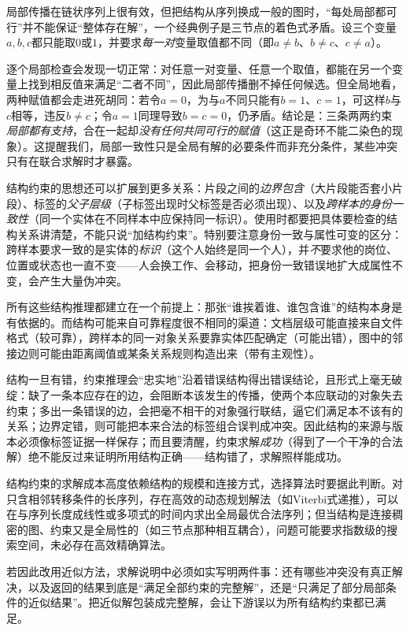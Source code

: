 局部传播在链状序列上很有效，但把结构从序列换成一般的图时，“每处局部都可行”并不能保证“整体存在解”，一个经典例子是三节点的着色式矛盾。设三个变量$a,b,c$都只能取$0$或$1$，并要求\emph{每一对}变量取值都不同（即$a\ne b$、$b\ne c$、$c\ne a$）。

逐个局部检查会发现一切正常：对任意一对变量、任意一个取值，都能在另一个变量上找到相反值来满足“二者不同”，因此局部传播删不掉任何候选。但全局地看，两种赋值都会走进死胡同：若令$a=0$，为与$a$不同只能有$b=1$、$c=1$，可这样$b$与$c$相等，违反$b\ne c$；令$a=1$同理导致$b=c=0$，仍矛盾。结论是：三条两两约束\emph{局部都有支持}，合在一起却\emph{没有任何共同可行的赋值}（这正是奇环不能二染色的现象）。这提醒我们，局部一致性只是全局有解的必要条件而非充分条件，某些冲突只有在联合求解时才暴露。

结构约束的思想还可以扩展到更多关系：片段之间的\emph{边界包含}（大片段能否套小片段）、标签的\emph{父子层级}（子标签出现时父标签是否必须出现）、以及\emph{跨样本的身份一致性}（同一个实体在不同样本中应保持同一标识）。使用时都要把具体要检查的结构关系讲清楚，不能只说“加结构约束”。特别要注意身份一致与属性可变的区分：跨样本要求一致的是实体的\emph{标识}（这个人始终是同一个人），并\emph{不}要求他的岗位、位置或状态也一直不变——人会换工作、会移动，把身份一致错误地扩大成属性不变，会产生大量伪冲突。

所有这些结构推理都建立在一个前提上：那张“谁挨着谁、谁包含谁”的结构本身是有依据的。而结构可能来自可靠程度很不相同的渠道：文档层级可能直接来自文件格式（较可靠），跨样本的同一对象关系要靠实体匹配确定（可能出错），图中的邻接边则可能由距离阈值或某条关系规则构造出来（带有主观性）。

结构一旦有错，约束推理会“忠实地”沿着错误结构得出错误结论，且形式上毫无破绽：缺了一条本应存在的边，会阻断本该发生的传播，使两个本应联动的对象失去约束；多出一条错误的边，会把毫不相干的对象强行联结，逼它们满足本不该有的关系；边界定错，则可能把本来合法的标签组合误判成冲突。因此结构的来源与版本必须像标签证据一样保存；而且要清醒，约束求解\emph{成功}（得到了一个干净的合法解）绝不能反过来证明所用结构正确——结构错了，求解照样能成功。

结构约束的求解成本高度依赖结构的规模和连接方式，选择算法时要据此判断。对只含相邻转移条件的长序列，存在高效的动态规划解法（如Viterbi式递推），可以在与序列长度成线性或多项式的时间内求出全局最优合法序列；但当结构是连接稠密的图、约束又是全局性的（如三节点那种相互耦合），问题可能要求指数级的搜索空间，未必存在高效精确算法。

若因此改用近似方法，求解说明中必须如实写明两件事：还有哪些冲突没有真正解决，以及返回的结果到底是“满足全部约束的完整解”，还是“只满足了部分局部条件的近似结果”。把近似解包装成完整解，会让下游误以为所有结构约束都已满足。

